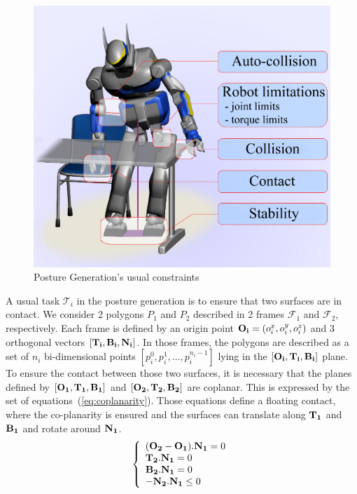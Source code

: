 \begin{figure}[!htb]
 \centering
 \includegraphics[width=.9\linewidth]{papers/IROS2014/figure/PG.png}
 \caption{Posture Generation's usual constraints}
 \label{fig:PG}
\end{figure}

A usual task $\mathcal{T}_i$ in the posture generation is to ensure that two surfaces are in contact. We consider 2 polygons $P_1$ and $P_2$ described in 2 frames $\mathcal{F}_1$ and $\mathcal{F}_2$, respectively. Each frame is defined by an origin point ${\bf O_i} = (o_i^x, o_i^y, o_i^z)$ and 3 orthogonal vectors $[{\bf T_i, B_i, N_i}]$. In those frames, the polygons are described as a set of $n_i$ bi-dimensional points $[p_i^0, p_i^1,\ldots, p_i^{n_i-1}]$ lying in the $[{\bf O_i, T_i, B_i}]$ plane.
To ensure the contact between those two surfaces, it is necessary that the planes defined by $[{\bf O_1, T_1, B_1}]$ and $[{\bf O_2, T_2, B_2}]$ are coplanar. This is expressed by the set of equations~(\ref{eq:coplanarity}). Those equations define a floating contact, where the co-planarity is ensured and the surfaces can translate along $\bf T_1$ and $\bf B_1$ and rotate around $\bf N_1$.
\begin{equation}
\left\{
\begin{array}{lr}
{\bf (O_2-O_1).N_1} = 0 \\
{\bf T_2.N_1} = 0 \\
{\bf B_2.N_1} = 0 \\
{\bf -N_2.N_1} \le 0
\end{array}
\right.
\label{eq:coplanarity}
\end{equation}

